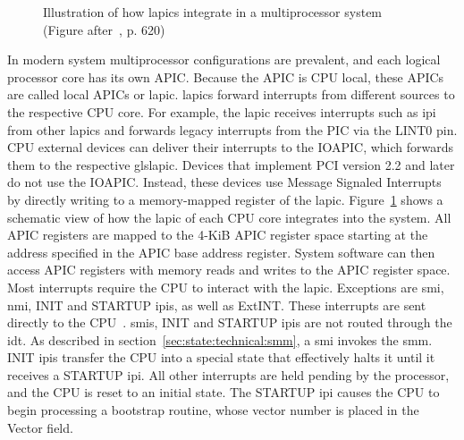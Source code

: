 
\begin{figure}
  \begin{center}
    
    \caption{Illustration of how \glspl{lapic} integrate in a
    multiprocessor system (Figure after~\cite{amd_manual}, p. 620)}
    \label{fig:state:technical:lapic}
  \end{center}
\end{figure}

In modern system multiprocessor configurations are prevalent, and each logical
processor core has its own APIC. Because the APIC is CPU local, these APICs are
called local APICs or \gls{lapic}. \glspl{lapic} forward interrupts from
different sources to the respective CPU core. For example, the \gls{lapic}
receives interrupts such as \gls{ipi} from other \glspl{lapic} and forwards
legacy interrupts from the PIC via the LINT0 pin. CPU external devices can
deliver their interrupts to the IOAPIC, which forwards them to the respective
gls{lapic}. Devices that implement PCI version 2.2 and later do not use the
IOAPIC. Instead, these devices use Message Signaled Interrupts by directly
writing to a memory-mapped register of the \gls{lapic}.
Figure~\ref{fig:state:technical:lapic} shows a schematic view of how the
\gls{lapic} of each CPU core integrates into the system. All APIC registers are
mapped to the 4-KiB APIC register space starting at the address specified in the
APIC base address register. System software can then access APIC registers with
memory reads and writes to the APIC register space. Most interrupts require the
CPU to interact with the \gls{lapic}. Exceptions are \gls{smi}, \gls{nmi}, INIT
and STARTUP \glspl{ipi}, as well as ExtINT. These interrupts are sent directly
to the CPU~\cite{amd_manual, intel_sdm}. \glspl{smi}, INIT and STARTUP
\glspl{ipi} are not routed through the \gls{idt}. As described in
section~\ref{sec:state:technical:smm}, a \gls{smi} invokes the \gls{smm}. INIT
\glspl{ipi} transfer the CPU into a special state that effectively halts it
until it receives a STARTUP \gls{ipi}. All other interrupts are held pending by
the processor, and the CPU is reset to an initial state. The STARTUP \gls{ipi}
causes the CPU to begin processing a bootstrap routine, whose vector number is
placed in the Vector field.

